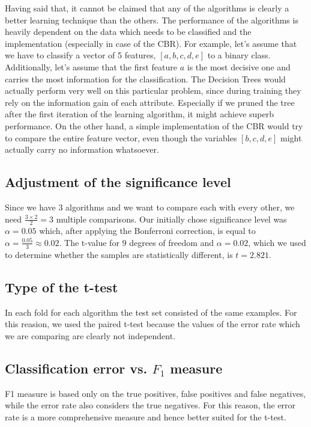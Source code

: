 \documentclass[a4paper]{article}
\begin{document}
Having said that, it cannot be claimed that any of the algorithms is clearly a better learning technique than the others. The performance of the algorithms is heavily dependent on the data which needs to be classified and the implementation (especially in case of the CBR). For example, let's assume that we have to classify a vector of 5 features, $[a,b,c,d,e]$ to a binary class. Additionally, let's assume that the first feature $a$ is the most decisive one and carries the most information for the classification. The Decision Trees would actually perform very well on this particular problem, since during training they rely on the information gain of each attribute. Especially if we pruned the tree after the first iteration of the learning algorithm, it might achieve superb performance. On the other hand, a simple implementation of the CBR would try to compare the entire feature vector, even though the variables $[b,c,d,e]$ might actually carry no information whatsoever.

\subsection{Adjustment of the significance level}

Since we have 3 algorithms and we want to compare each with every other, we need $\frac{3 \times 2}{2} = 3$ multiple comparisons. Our initially chose significance level was $\alpha = 0.05$ which, after applying the Bonferroni correction, is equal to $\alpha = \frac{0.05}{3} \approx 0.02$. The t-value for 9 degrees of freedom and $\alpha = 0.02$, which we used to determine whether the samples are statistically different, is $t = 2.821$.

\subsection{Type of the t-test}

In each fold for each algorithm the test set consisted of the same examples. For this reasion, we used the paired t-test because the values of the error rate which we are comparing are clearly not independent.

\subsection{Classification error vs. $F_1$ measure}

F1 measure is based only on the true positives, false positives and false negatives, while the error rate also considers the true negatives. For this reason, the error rate is a more comprehensive measure and hence better suited for the t-test.
\end{document}
